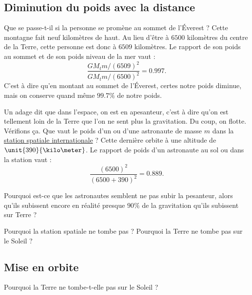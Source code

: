 \documentclass[a4paper,12pt]{book}
\theoremstyle{mes_exemples}	\newtheorem{exemple}[numtho]{Exemple}
\theoremstyle{mes_tho}
\begin{document}
\subsection{Diminution du poids avec la distance}

Que se passe-t-il si la personne se promène au sommet de l'Éverest ? Cette montagne fait neuf kilomètres de haut. Au lieu d'être à $6500$ kilomètres du centre de la Terre, cette personne est donc à $6509$ kilomètres. Le rapport de son poids au sommet et de son poids niveau de la mer vaut :
\[ 
  \frac{ GM_tm/(6509)^2 }{ GM_tm/(6500)^2 }=0.997.
\]
C'est à dire qu'en montant au sommet de l'Éverest, certes notre poids diminue, mais on conserve quand même $99.7\%$ de notre poids.

Un adage dit que dans l'espace, on est en apesanteur, c'est à dire qu'on est tellement loin de la Terre que l'on ne sent plus la gravitation. Du coup, on flotte. Vérifions ça. Que vaut le poids d'un ou d'une astronaute de masse $m$ dans la \href{http://fr.wikipedia.org/wiki/Station_spatiale_internationale}{station spatiale internationale} ? Cette dernière orbite à une altitude de $\unit{390}{\kilo\meter}$. Le rapport de poids d'un astronaute au sol ou dans la station vaut :
\[ 
  \frac{ (6500)^2 }{ (6500+390)^2 }=0.889.
\]

\begin{probleme}
	Pourquoi est-ce que les astronautes semblent ne pas subir la pesanteur, alors qu'ils subissent encore en réalité presque $90\%$ de la gravitation qu'ils subissent sur Terre ?

	Pourquoi la station spatiale ne tombe pas ? Pourquoi la Terre ne tombe pas sur le Soleil ?
\end{probleme}




\subsection{Mise en orbite}
\label{SubSecMiseEnOrbite}
Pourquoi la Terre ne tombe-t-elle pas sur le Soleil ? 
\end{document}
